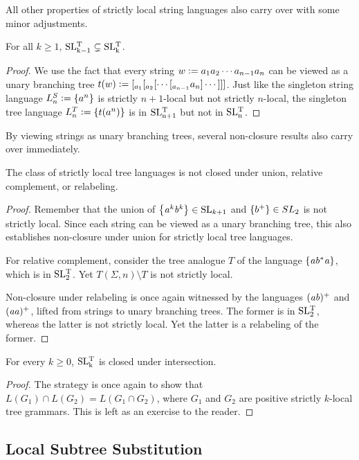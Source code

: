 All other properties of strictly local string languages also carry over with some minor adjustments.
%
\begin{theorem}
    For all $k \geq 1$, $\SLT[k-1] \subsetneq \SLT[k]$.
\end{theorem}
%
\begin{proof}
    We use the fact that every string $w \is a_1 a_2 \cdots a_{n-1} a_n$ can be viewed as a unary branching tree $t(w) \is [_{a_1} [_{a_2} [ \cdots [_{a_{n-1}} a_n ] \cdots ] ] ]$.
    Just like the singleton string language $L^S_n \is \setof{ a^n }$ is strictly $n+1$-local but not strictly $n$-local, the singleton tree language $L^T_n \is \setof {t(a^n)}$ is in $\SLT[n+1]$ but not in $\SLT[n]$.
\end{proof}
%
By viewing strings as unary branching trees, several non-closure results also carry over immediately.
%
\begin{theorem}
    The class of strictly local tree languages is not closed under union, relative complement, or relabeling.
\end{theorem}
%
\begin{proof}
    Remember that the union of $\setof{\String{a^k b^k}} \in \SL_{k+1}$ and $\setof{b^+} \in SL_2$ is not strictly local.
    Since each string can be viewed as a unary branching tree, this also establishes non-closure under union for strictly local tree languages.

    For relative complement, consider the tree analogue $T$ of the language $\setof{\String{ab^*a}}$, which is in $\SLT[2]$.
    Yet $T(\Sigma,n) \setminus T$ is not strictly local. 

    Non-closure under relabeling is once again witnessed by the languages $(\String{ab})^+$ and $(\String{aa})^+$, lifted from strings to unary branching trees.
    The former is in $\SLT[2]$, whereas the latter is not strictly local.
    Yet the latter is a relabeling of the former.
\end{proof}

\begin{theorem}
    For every $k \geq 0$, $\SLT[k]$ is closed under intersection.
\end{theorem}
%
\begin{proof}
    The strategy is once again to show that $L(G_1) \cap L(G_2) = L(G_1 \cap G_2)$, where $G_1$ and $G_2$ are positive strictly $k$-local tree grammars.
    This is left as an exercise to the reader.
\end{proof}

\subsection{Local Subtree Substitution}

